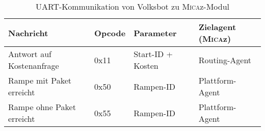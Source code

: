 \begin{table}[h!]
\centering
\begin{tabular}{| l | l | l | l |}
  \hline
  Nachricht & Opcode & Parameter & Zielagent (\textsc{Mica}z) \\
  \hline
  Antwort auf Kostenanfrage & 0x11 & Start-ID + Kosten & Routing-Agent \\
  Rampe mit Paket erreicht & 0x50 & Rampen-ID & Plattform-Agent\\
  Rampe ohne Paket erreicht & 0x55 & Rampen-ID & Plattform-Agent\\
  \hline
\end{tabular}
\caption{UART-Kommunikation von Volksbot zu \textsc{Mica}z-Modul}
\label{tab:UART_DF}
\end{table}